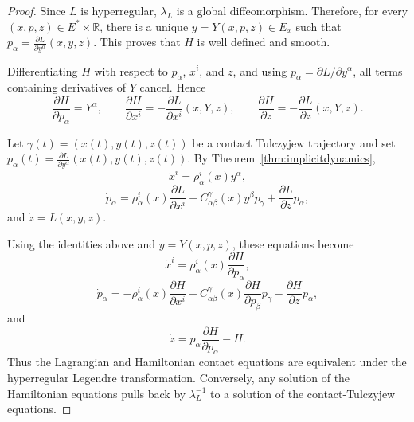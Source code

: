 \documentclass[11pt]{article}
\newcommand{\R}{\mathbb{R}}
\begin{document}
\begin{proof}
Since \(L\) is hyperregular, \(\lambda_L\) is a global diffeomorphism. Therefore,
for every \((x,p,z)\in E^*\times\R\), there is a unique
\(y=Y(x,p,z)\in E_x\) such that $p_\alpha=\frac{\partial L}{\partial y^\alpha}(x,y,z)$.
This proves that \(H\) is well defined and smooth.

Differentiating \(H\) with respect to \(p_\alpha\), \(x^i\), and \(z\), and using
\(p_\alpha=\partial L/\partial y^\alpha\), all terms containing derivatives of
\(Y\) cancel. Hence
\[
\frac{\partial H}{\partial p_\alpha}=Y^\alpha,\qquad
\frac{\partial H}{\partial x^i}
=
-\frac{\partial L}{\partial x^i}(x,Y,z),
\qquad
\frac{\partial H}{\partial z}
=
-\frac{\partial L}{\partial z}(x,Y,z).
\]

Let \(\gamma(t)=(x(t),y(t),z(t))\) be a contact Tulczyjew trajectory and set
$p_\alpha(t)=\frac{\partial L}{\partial y^\alpha}(x(t),y(t),z(t))$. By Theorem~\ref{thm:implicitdynamics},
\[
\dot x^i=\rho^i_\alpha(x)y^\alpha,
\]
\[
\dot p_\alpha
=
\rho^i_\alpha(x)\frac{\partial L}{\partial x^i}
-
C^\gamma_{\alpha\beta}(x)y^\beta p_\gamma
+
\frac{\partial L}{\partial z}p_\alpha,
\]
and $\dot z=L(x,y,z)$.

Using the identities above and \(y=Y(x,p,z)\), these equations become
\[
\dot x^i
=
\rho^i_\alpha(x)\frac{\partial H}{\partial p_\alpha},
\]
\[
\dot p_\alpha
=
-\rho^i_\alpha(x)\frac{\partial H}{\partial x^i}
-
C^\gamma_{\alpha\beta}(x)
\frac{\partial H}{\partial p_\beta}p_\gamma
-
\frac{\partial H}{\partial z}p_\alpha,
\]
and
\[
\dot z
=
p_\alpha\frac{\partial H}{\partial p_\alpha}-H.
\]
Thus the Lagrangian and Hamiltonian contact equations are equivalent under
the hyperregular Legendre transformation. Conversely, any solution of the
Hamiltonian equations pulls back by \(\lambda_L^{-1}\) to a solution of the
contact-Tulczyjew equations.
\end{proof}
\end{document}
